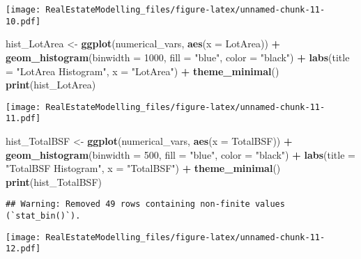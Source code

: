 \documentclass[
]{article}
\newenvironment{Shaded}{\begin{snugshade}}{\end{snugshade}}
\newcommand{\AttributeTok}[1]{\textcolor[rgb]{0.13,0.29,0.53}{#1}}
\newcommand{\DecValTok}[1]{\textcolor[rgb]{0.00,0.00,0.81}{#1}}
\newcommand{\FunctionTok}[1]{\textcolor[rgb]{0.13,0.29,0.53}{\textbf{#1}}}
\newcommand{\NormalTok}[1]{#1}
\newcommand{\OtherTok}[1]{\textcolor[rgb]{0.56,0.35,0.01}{#1}}
\newcommand{\SpecialCharTok}[1]{\textcolor[rgb]{0.81,0.36,0.00}{\textbf{#1}}}
\newcommand{\StringTok}[1]{\textcolor[rgb]{0.31,0.60,0.02}{#1}}
\begin{document}
\texttt{[image: RealEstateModelling\_files/figure-latex/unnamed-chunk-11-10.pdf]}

\begin{Shaded}
\begin{Highlighting}[]
\NormalTok{hist\_LotArea }\OtherTok{\textless{}{-}} \FunctionTok{ggplot}\NormalTok{(numerical\_vars, }\FunctionTok{aes}\NormalTok{(}\AttributeTok{x =}\NormalTok{ LotArea)) }\SpecialCharTok{+}
  \FunctionTok{geom\_histogram}\NormalTok{(}\AttributeTok{binwidth =} \DecValTok{1000}\NormalTok{, }\AttributeTok{fill =} \StringTok{"blue"}\NormalTok{, }\AttributeTok{color =} \StringTok{"black"}\NormalTok{) }\SpecialCharTok{+}
  \FunctionTok{labs}\NormalTok{(}\AttributeTok{title =} \StringTok{"LotArea Histogram"}\NormalTok{, }\AttributeTok{x =} \StringTok{"LotArea"}\NormalTok{) }\SpecialCharTok{+}
  \FunctionTok{theme\_minimal}\NormalTok{()}
\FunctionTok{print}\NormalTok{(hist\_LotArea)}
\end{Highlighting}
\end{Shaded}

\texttt{[image: RealEstateModelling\_files/figure-latex/unnamed-chunk-11-11.pdf]}

\begin{Shaded}
\begin{Highlighting}[]
\NormalTok{hist\_TotalBSF }\OtherTok{\textless{}{-}} \FunctionTok{ggplot}\NormalTok{(numerical\_vars, }\FunctionTok{aes}\NormalTok{(}\AttributeTok{x =}\NormalTok{ TotalBSF)) }\SpecialCharTok{+}
  \FunctionTok{geom\_histogram}\NormalTok{(}\AttributeTok{binwidth =} \DecValTok{500}\NormalTok{, }\AttributeTok{fill =} \StringTok{"blue"}\NormalTok{, }\AttributeTok{color =} \StringTok{"black"}\NormalTok{) }\SpecialCharTok{+}
  \FunctionTok{labs}\NormalTok{(}\AttributeTok{title =} \StringTok{"TotalBSF Histogram"}\NormalTok{, }\AttributeTok{x =} \StringTok{"TotalBSF"}\NormalTok{) }\SpecialCharTok{+}
  \FunctionTok{theme\_minimal}\NormalTok{()}
\FunctionTok{print}\NormalTok{(hist\_TotalBSF)}
\end{Highlighting}
\end{Shaded}

\begin{verbatim}
## Warning: Removed 49 rows containing non-finite values (`stat_bin()`).
\end{verbatim}

\texttt{[image: RealEstateModelling\_files/figure-latex/unnamed-chunk-11-12.pdf]}
\end{document}
